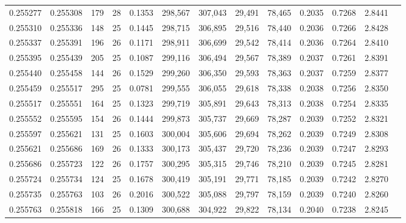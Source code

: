 \begin{tabular}{rrrrrrrrrrrrr}
0.255277 & 0.255308 &   179 &  28 &                                     0.1353 & 298,567 & 307,043 &  29,491 &  78,465 & 0.2035 & 0.7268 & 2.8441 \\
0.255310 & 0.255336 &   148 &  25 &                                     0.1445 & 298,715 & 306,895 &  29,516 &  78,440 & 0.2036 & 0.7266 & 2.8428 \\
0.255337 & 0.255391 &   196 &  26 &                                     0.1171 & 298,911 & 306,699 &  29,542 &  78,414 & 0.2036 & 0.7264 & 2.8410 \\
0.255395 & 0.255439 &   205 &  25 &                                     0.1087 & 299,116 & 306,494 &  29,567 &  78,389 & 0.2037 & 0.7261 & 2.8391 \\
0.255440 & 0.255458 &   144 &  26 &                                     0.1529 & 299,260 & 306,350 &  29,593 &  78,363 & 0.2037 & 0.7259 & 2.8377 \\
0.255459 & 0.255517 &   295 &  25 &                                     0.0781 & 299,555 & 306,055 &  29,618 &  78,338 & 0.2038 & 0.7256 & 2.8350 \\
0.255517 & 0.255551 &   164 &  25 &                                     0.1323 & 299,719 & 305,891 &  29,643 &  78,313 & 0.2038 & 0.7254 & 2.8335 \\
0.255552 & 0.255595 &   154 &  26 &                                     0.1444 & 299,873 & 305,737 &  29,669 &  78,287 & 0.2039 & 0.7252 & 2.8321 \\
0.255597 & 0.255621 &   131 &  25 &                                     0.1603 & 300,004 & 305,606 &  29,694 &  78,262 & 0.2039 & 0.7249 & 2.8308 \\
0.255621 & 0.255686 &   169 &  26 &                                     0.1333 & 300,173 & 305,437 &  29,720 &  78,236 & 0.2039 & 0.7247 & 2.8293 \\
0.255686 & 0.255723 &   122 &  26 &                                     0.1757 & 300,295 & 305,315 &  29,746 &  78,210 & 0.2039 & 0.7245 & 2.8281 \\
0.255724 & 0.255734 &   124 &  25 &                                     0.1678 & 300,419 & 305,191 &  29,771 &  78,185 & 0.2039 & 0.7242 & 2.8270 \\
0.255735 & 0.255763 &   103 &  26 &                                     0.2016 & 300,522 & 305,088 &  29,797 &  78,159 & 0.2039 & 0.7240 & 2.8260 \\
0.255763 & 0.255818 &   166 &  25 &                                     0.1309 & 300,688 & 304,922 &  29,822 &  78,134 & 0.2040 & 0.7238 & 2.8245 \\

\end{tabular}
